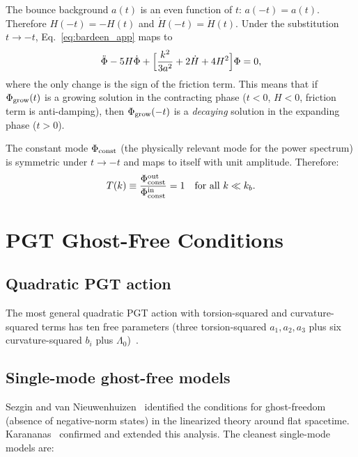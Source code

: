 \documentclass[aps,prd,twocolumn,superscriptaddress,showpacs,preprintnumbers,
  nofootinbib,longbibliography,floatfix]{revtex4-2}
\begin{document}
The bounce background $a(t)$ is an even function of $t$:
$a(-t) = a(t)$. Therefore $H(-t) = -H(t)$ and $\dot H(-t) = \dot H(t)$.
Under the substitution $t \to -t$, Eq.~\eqref{eq:bardeen_app} maps to
\begin{equation}
  \ddot\Phi - 5H\dot\Phi +
  \Bigl[\frac{k^2}{3a^2} + 2\dot H + 4H^2\Bigr]\Phi = 0,
\end{equation}
where the only change is the sign of the friction term. This means that
if $\Phi_{\rm grow}(t)$ is a growing solution in the contracting phase
($t < 0$, $H < 0$, friction term is anti-damping), then
$\Phi_{\rm grow}(-t)$ is a \textit{decaying} solution in the expanding
phase ($t > 0$).

The constant mode $\Phi_{\rm const}$ (the physically relevant mode for
the power spectrum) is symmetric under $t \to -t$ and maps to itself
with unit amplitude. Therefore:
\begin{equation}
  T(k) \equiv \frac{\Phi_{\rm const}^{\rm out}}
  {\Phi_{\rm const}^{\rm in}} = 1
  \quad \text{for all } k \ll k_b.
\end{equation}


\section{PGT Ghost-Free Conditions}\label{app:ghost}

\subsection{Quadratic PGT action}

The most general quadratic PGT action with torsion-squared and
curvature-squared terms has ten free parameters (three torsion-squared
$a_1, a_2, a_3$ plus six curvature-squared $b_i$ plus
$\Lambda_0$)~\cite{HayashiShirafuji1980,Neville1980,
SezginNieuwenhuizen1980}.

\subsection{Single-mode ghost-free models}

Sezgin and van Nieuwenhuizen~\cite{SezginNieuwenhuizen1980} identified
the conditions for ghost-freedom (absence of negative-norm states) in
the linearized theory around flat spacetime. Karananas~\cite{Karananas2015}
confirmed and extended this analysis. The cleanest single-mode models are:
\end{document}
